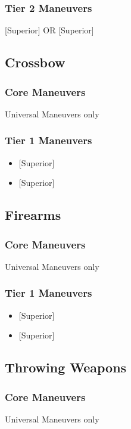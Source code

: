 \documentclass[oneside,11pt,english]{book}
\begin{document}
\subsubsection{Tier 2 Maneuvers}
 [Superior] OR  [Superior]

\subsection{Crossbow}
\subsubsection{Core Maneuvers}
Universal Maneuvers only 

\subsubsection{Tier 1 Maneuvers}
\vspace{-5pt}\begin{itemize}
  [itemsep=0.5mm]
\item {} [Superior]
\item {} [Superior]
\end{itemize}
\subsection{Firearms}
\subsubsection{Core Maneuvers}
Universal Maneuvers only

\subsubsection{Tier 1 Maneuvers}
\vspace{-5pt}\begin{itemize}
  [itemsep=0.5mm]
\item {} [Superior]
\item {} [Superior]
\end{itemize}
\subsection{Throwing Weapons}
\subsubsection{Core Maneuvers}
Universal Maneuvers only
\end{document}
